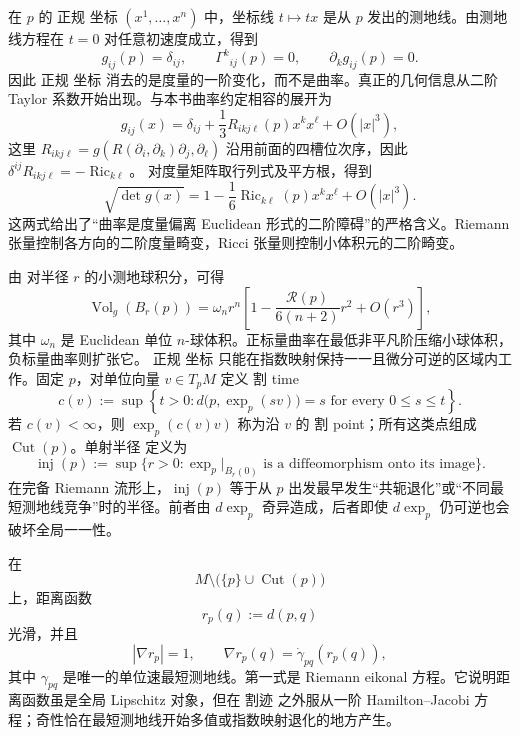 在 $p$ 的 正规 坐标 $(x^1,\ldots,x^n)$ 中，坐标线 $t\mapsto tx$ 是从 $p$ 发出的测地线。由测地线方程在 $t=0$ 对任意初速度成立，得到
\begin{equation*}g_{ij}(p)=\delta_{ij},
\qquad
\Gamma^k{}_{ij}(p)=0,
\qquad
\partial_k g_{ij}(p)=0.
\end{equation*}
因此 正规 坐标 消去的是度量的一阶变化，而不是曲率。真正的几何信息从二阶 Taylor 系数开始出现。与本书曲率约定相容的展开为
\begin{equation*}g_{ij}(x)
 =\delta_{ij}
 +\frac13 R_{ikj\ell}(p)x^k x^\ell
 +O(|x|^3),
\end{equation*}
这里 $R_{ikj\ell}=g(R(\partial_i,\partial_k)\partial_j,\partial_\ell)$ 沿用前面的四槽位次序，因此 $\delta^{ij}R_{ikj\ell}=-\operatorname{Ric}_{k\ell}$。
对度量矩阵取行列式及平方根，得到
\begin{equation}\label{eq:math-dg-normal-volume-expansion}
 \sqrt{\det g(x)}
 =1-\frac16\operatorname{Ric}_{k\ell}(p)x^k x^\ell
 +O(|x|^3).
\end{equation}
这两式给出了“曲率是度量偏离 Euclidean 形式的二阶障碍”的严格含义。Riemann 张量控制各方向的二阶度量畸变，Ricci 张量则控制小体积元的二阶畸变。

由  对半径 $r$ 的小测地球积分，可得
\begin{equation*}\operatorname{Vol}_g(B_r(p))
=\omega_n r^n
\left[
1-\frac{\mathcal R(p)}{6(n+2)}r^2+O(r^3)
\right],
\end{equation*}
其中 $\omega_n$ 是 Euclidean 单位 $n$-球体积。正标量曲率在最低非平凡阶压缩小球体积，负标量曲率则扩张它。
正规 坐标 只能在指数映射保持一一且微分可逆的区域内工作。固定 $p$，对单位向量 $v\in T_pM$ 定义 割 time
\begin{equation*}c(v):=\sup\left\{t>0:
 d\bigl(p,\exp_p(sv)\bigr)=s
 \text{ for every }0\le s\le t
 \right\}.
\end{equation*}
若 $c(v)<\infty$，则 $\exp_p(c(v)v)$ 称为沿 $v$ 的 割 point；所有这类点组成 $\operatorname{Cut}(p)$。单射半径 定义为
\begin{equation*}\operatorname{inj}(p):=\sup\{r>0:
 \exp_p|_{B_r(0)}\text{ is a diffeomorphism onto its image}\}.
\end{equation*}
在完备 Riemann 流形上，$\operatorname{inj}(p)$ 等于从 $p$ 出发最早发生“共轭退化”或“不同最短测地线竞争”时的半径。前者由 $d\exp_p$ 奇异造成，后者即使 $d\exp_p$ 仍可逆也会破坏全局一一性。

在
\[
M\setminus\bigl(\{p\}\cup\operatorname{Cut}(p)\bigr)
\]
上，距离函数
\[
r_p(q):=d(p,q)
\]
光滑，并且
\begin{equation*}|\nabla r_p|=1,
\qquad
\nabla r_p(q)=\dot\gamma_{pq}(r_p(q)),
\end{equation*}
其中 $\gamma_{pq}$ 是唯一的单位速最短测地线。第一式是 Riemann eikonal 方程。它说明距离函数虽是全局 Lipschitz 对象，但在 割迹 之外服从一阶 Hamilton--Jacobi 方程；奇性恰在最短测地线开始多值或指数映射退化的地方产生。

